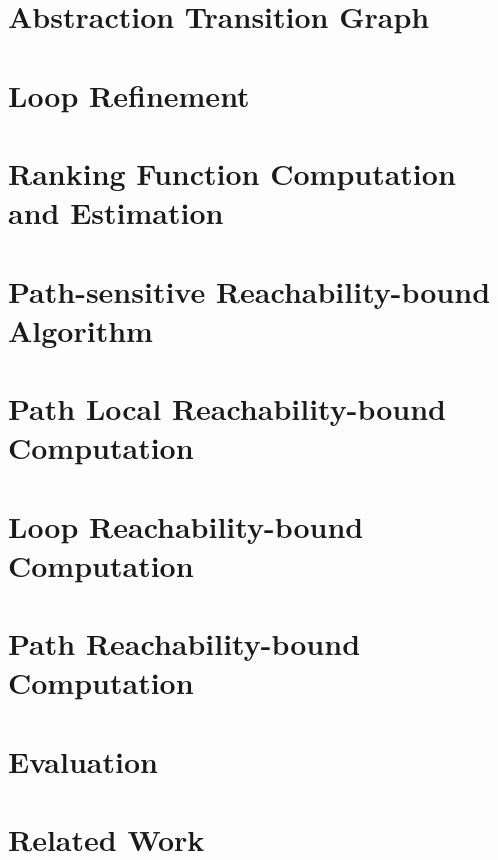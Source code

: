\documentclass[runningheads]{llncs}
\begin{document}
\section{Abstraction Transition Graph}
\label{sec:progabs}

\section{Loop Refinement}
\label{sec:refine}

\section{Ranking Function Computation and Estimation}
\label{sec:rank}

\section{Path-sensitive Reachability-bound Algorithm}
\label{sec:psrb}

\section{Path Local Reachability-bound Computation}
\label{sec:pathlocalrb}


\section{Loop Reachability-bound Computation}
\label{sec:looprb}

% 
\section{Path Reachability-bound Computation}
\label{sec:pathrb}


% 

\section{Evaluation}
\label{sec:eval}

\section{Related Work}
\label{sec:relatedwork}

%
\end{document}
